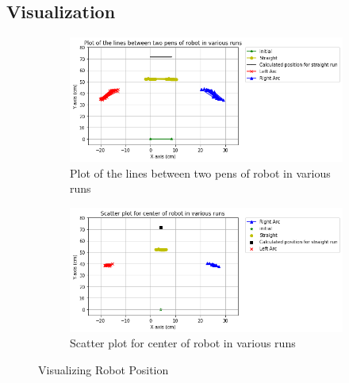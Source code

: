 \documentclass[10pt,a4paper]{article}
\begin{document}
				 \subsection{Visualization}
					 \begin{figure}[H]
						 	\begin{subfigure}{0.5\textwidth}
						 		\centering
						 		\includegraphics[width=0.9\linewidth]{img/line_plot.png}
						 		\caption{Plot of the lines between two pens of robot in various runs}
						 	\end{subfigure}%
						 	\hfill
						 	\begin{subfigure}{0.5\textwidth}
						 		\centering
						 		\includegraphics[width=0.9\linewidth]{img/scatter_plot.png}
						 		\caption{Scatter plot for center of robot in various runs}
						 	\end{subfigure}
						 	\caption{Visualizing Robot Position}
					 \end{figure}
\end{document}
